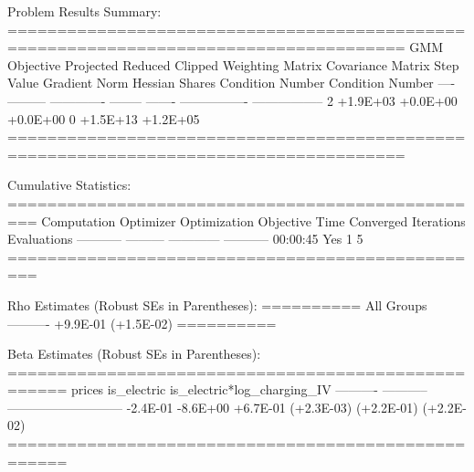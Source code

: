 Problem Results Summary:
======================================================================================
GMM   Objective    Projected    Reduced   Clipped  Weighting Matrix  Covariance Matrix
Step    Value    Gradient Norm  Hessian   Shares   Condition Number  Condition Number 
----  ---------  -------------  --------  -------  ----------------  -----------------
 2    +1.9E+03     +0.0E+00     +0.0E+00     0         +1.5E+13          +1.2E+05     
======================================================================================

Cumulative Statistics:
=================================================
Computation  Optimizer  Optimization   Objective 
   Time      Converged   Iterations   Evaluations
-----------  ---------  ------------  -----------
 00:00:45       Yes          1             5     
=================================================

Rho Estimates (Robust SEs in Parentheses):
==========
All Groups
----------
 +9.9E-01 
(+1.5E-02)
==========

Beta Estimates (Robust SEs in Parentheses):
====================================================
  prices    is_electric  is_electric*log_charging_IV
----------  -----------  ---------------------------
 -2.4E-01    -8.6E+00             +6.7E-01          
(+2.3E-03)  (+2.2E-01)           (+2.2E-02)         
====================================================